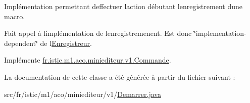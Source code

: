 Implémentation permettant d\textquotesingle{}effectuer l\textquotesingle{}action débutant l\textquotesingle{}enregistrement d\textquotesingle{}une macro. 

Fait appel à l\textquotesingle{}implémentation de l\textquotesingle{}enregistremenent. Est donc \char`\"{}implementation-\/dependent\char`\"{} de l\textquotesingle{}\hyperlink{interfacefr_1_1istic_1_1m1_1_1aco_1_1miniediteur_1_1v1_1_1Enregistreur}{Enregistreur}. 

Implémente \hyperlink{interfacefr_1_1istic_1_1m1_1_1aco_1_1miniediteur_1_1v1_1_1Commande_a87a8a55bac4e81e32339248f79f7de4f}{fr.\+istic.\+m1.\+aco.\+miniediteur.\+v1.\+Commande}.



La documentation de cette classe a été générée à partir du fichier suivant \+:\begin{DoxyCompactItemize}
\item 
src/fr/istic/m1/aco/miniediteur/v1/\hyperlink{Demarrer_8java}{Demarrer.\+java}\end{DoxyCompactItemize}
